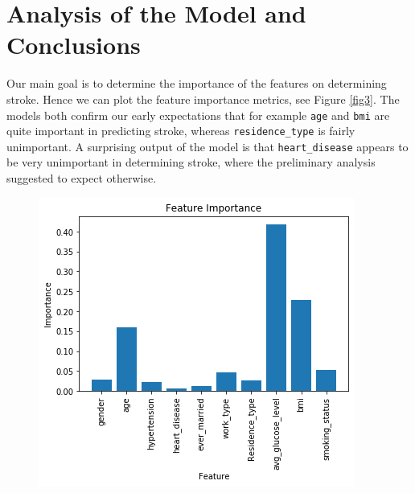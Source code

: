\documentclass[10pt]{article}
\begin{document}
\section{Analysis of the Model and Conclusions}
Our main goal is to determine the importance of the features on determining stroke. Hence we can plot the feature importance metrics, see Figure \ref{fig3}. The models both confirm our early expectations that for example \texttt{age} and \texttt{bmi} are quite important in predicting stroke, whereas \texttt{residence\_type} is fairly unimportant. A surprising output of the model is that \texttt{heart\_disease} appears to be very unimportant in determining stroke, where the preliminary analysis suggested to expect otherwise.
\begin{figure}[h!]
\centering  
\begin{minipage}[b]{0.45\textwidth}
    \includegraphics[width=\textwidth]{index4.png}
  \end{minipage}
  \hfill
  \begin{minipage}[b]{0.45\textwidth}

\end{minipage}
\end{figure}
\end{document}
